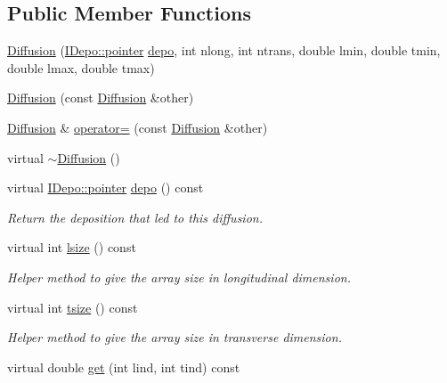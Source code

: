 \subsection*{Public Member Functions}
\begin{DoxyCompactItemize}
\item 
\hyperlink{class_wire_cell_1_1_diffusion_a5cec68960d93a5a1293b1c3539035cca}{Diffusion} (\hyperlink{class_wire_cell_1_1_i_data_aff870b3ae8333cf9265941eef62498bc}{I\+Depo\+::pointer} \hyperlink{class_wire_cell_1_1_diffusion_a6d2cefc927cf2ae6c85587a7f579c01d}{depo}, int nlong, int ntrans, double lmin, double tmin, double lmax, double tmax)
\item 
\hyperlink{class_wire_cell_1_1_diffusion_a3665efc0e63c028a68813b8feb87dfb2}{Diffusion} (const \hyperlink{class_wire_cell_1_1_diffusion}{Diffusion} \&other)
\item 
\hyperlink{class_wire_cell_1_1_diffusion}{Diffusion} \& \hyperlink{class_wire_cell_1_1_diffusion_a245502cf5fcf7e278504f55263668a13}{operator=} (const \hyperlink{class_wire_cell_1_1_diffusion}{Diffusion} \&other)
\item 
virtual \hyperlink{class_wire_cell_1_1_diffusion_a70bb6c0517b78c64ef52677863858a79}{$\sim$\+Diffusion} ()
\item 
virtual \hyperlink{class_wire_cell_1_1_i_data_aff870b3ae8333cf9265941eef62498bc}{I\+Depo\+::pointer} \hyperlink{class_wire_cell_1_1_diffusion_a6d2cefc927cf2ae6c85587a7f579c01d}{depo} () const
\begin{DoxyCompactList}\small\item\em Return the deposition that led to this diffusion. \end{DoxyCompactList}\item 
virtual int \hyperlink{class_wire_cell_1_1_diffusion_aa590710356f717e695ebd9d49e3ef207}{lsize} () const
\begin{DoxyCompactList}\small\item\em Helper method to give the array size in longitudinal dimension. \end{DoxyCompactList}\item 
virtual int \hyperlink{class_wire_cell_1_1_diffusion_a0833d46be2aba6c268fef7dbd7fc2245}{tsize} () const
\begin{DoxyCompactList}\small\item\em Helper method to give the array size in transverse dimension. \end{DoxyCompactList}\item 
virtual double \hyperlink{class_wire_cell_1_1_diffusion_a765cac5acd074254aef9782b37292c1a}{get} (int lind, int tind) const

\end{DoxyCompactItemize}
